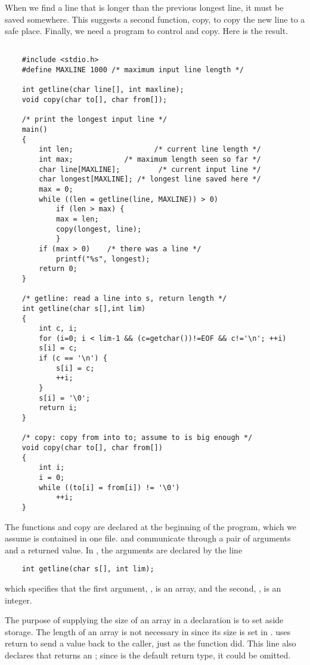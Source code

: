 When we find a line that is longer than the previous longest line, it must be saved somewhere.
This suggests a second function, copy, to copy the new line to a safe place.
Finally, we need a  program to control  and copy. Here is the result.
\begin{lstlisting}

	#include <stdio.h>
	#define MAXLINE 1000 /* maximum input line length */

	int getline(char line[], int maxline);
	void copy(char to[], char from[]);

	/* print the longest input line */
	main()
	{
		int len; 			       /* current line length */
		int max; 			/* maximum length seen so far */
		char line[MAXLINE];         /* current input line */
		char longest[MAXLINE]; /* longest line saved here */
		max = 0;
		while ((len = getline(line, MAXLINE)) > 0)
			if (len > max) {
			max = len;
			copy(longest, line);
			}
		if (max > 0) 	/* there was a line */
			printf("%s", longest);
		return 0;
	}

	/* getline: read a line into s, return length */
	int getline(char s[],int lim)
	{
		int c, i;
		for (i=0; i < lim-1 && (c=getchar())!=EOF && c!='\n'; ++i)
		s[i] = c;
		if (c == '\n') {
			s[i] = c;
			++i;
		}
		s[i] = '\0';
		return i;
	}

	/* copy: copy from into to; assume to is big enough */
	void copy(char to[], char from[])
	{
		int i;
		i = 0;
		while ((to[i] = from[i]) != '\0')
			++i;
	}
\end{lstlisting}
The functions  and copy are declared at the beginning of the program, which we assume is contained in one file.
 and  communicate through a pair of arguments and a returned value.
In , the arguments are declared by the line
\begin{lstlisting}
	int getline(char s[], int lim);
\end{lstlisting}
which specifies that the first argument, , is an array, and the second, , is an integer.

The purpose of supplying the size of an array in a declaration is to set aside storage.
The length of an array  is not necessary in  since its size is set in .
 uses return to send a value back to the caller, just as the function  did.
This line also declares that  returns an ; since  is the default return type, it could be omitted.

